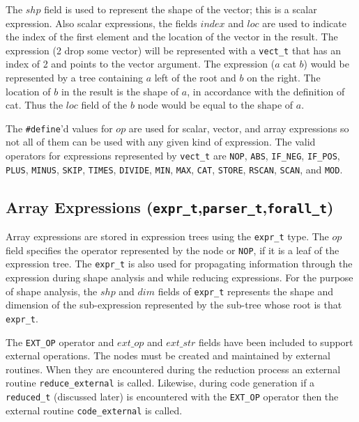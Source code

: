   The $shp$ field is used to represent the shape of the vector; this is a
scalar expression.  Also scalar expressions, the fields $index$ and $loc$
are used to indicate the index of the first element and the location of
the vector in the result.  The expression (2 drop some vector)
will be represented with a {\tt vect\_t} that has an index
of 2 and points to the vector argument.  The expression ($a$ cat $b$) would be
represented by a tree containing $a$ left of the root and $b$ on the right.
The location of $b$ in the result is the shape of $a$, in accordance with
the definition of cat.  Thus the $loc$ field of the $b$ node would be equal to
the shape of $a$.

The {\tt \#define}'d values for $op$ are used for scalar, vector, and array 
expressions so not all of them can be used with any given kind of expression.
The valid operators for expressions represented by {\tt vect\_t} are
{\tt NOP}, {\tt ABS}, {\tt IF\_NEG}, {\tt IF\_POS}, {\tt PLUS}, {\tt MINUS},
{\tt SKIP}, {\tt TIMES}, {\tt DIVIDE}, {\tt MIN}, {\tt MAX}, {\tt CAT},
{\tt STORE}, {\tt RSCAN}, {\tt SCAN}, and {\tt MOD}.

\subsection{Array Expressions ({\tt expr\_t},{\tt parser\_t},{\tt forall\_t})}
Array expressions are stored in expression trees using the {\tt expr\_t} type.
The $op$ field specifies the operator represented by the node or {\tt NOP}, if
it is a leaf of the expression tree.
The {\tt expr\_t} is also used for propagating information through the expression
during shape analysis and while reducing expressions.  For the purpose of
shape analysis, the $shp$ and $dim$ fields of {\tt expr\_t} represents the shape and
dimension of the
sub-expression represented by the sub-tree whose root is that {\tt expr\_t}.

The {\tt EXT\_OP} operator and $ext\_op$ and $ext\_str$ fields
have been included to support external operations.
The nodes must be created and maintained by external routines.  When they
are encountered during the reduction process an external routine 
{\tt reduce\_external} is called.  Likewise, during code generation if 
a {\tt reduced\_t} (discussed later) is encountered with the {\tt EXT\_OP} operator then
the external routine {\tt code\_external} is called.


